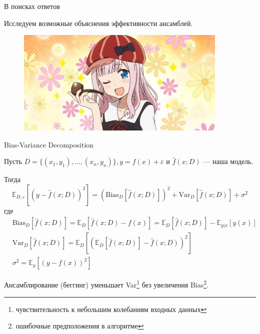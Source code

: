 \documentclass[9pt]{beamer}
\begin{document}
\begin{frame}{В поисках ответов}
    \begin{block}{}
        Исследуем возможные объяснения эффективности ансамблей.
    \end{block}

    \begin{figure}
        \centering
        \includegraphics[width=0.9\textwidth]{images/image4.png}
    \end{figure}
\end{frame}

\begin{frame}{Bias-Variance Decomposition}
    \begin{block}{Пусть}
        $D = \{ (x_1, y_1), \ldots, (x_n, y_n) \}, y = f(x) + \varepsilon$ и $\hat{f}(x; D)$ --- наша модель.
    \end{block}

    \begin{block}{Тогда}
        \begin{equation*}
            \mathbb{E}_{D, \varepsilon} \left[ (y - \hat{f}(x; D))^2 \right] = \left( \text{Bias}_D \left[ \hat{f}(x; D) \right] \right)^2 + \text{Var}_D \left[ \hat{f}(x; D) \right] + \sigma^2
        \end{equation*}
        где
        \begin{align*}
            &\text{Bias}_D \left[ \hat{f}(x; D) \right] = \mathbb{E}_D \left[ \hat{f}(x; D) - f(x) \right] = \mathbb{E}_D \left[ \hat{f}(x; D) \right] - \mathbb{E}_{y | x} \left[ y(x) \right] \\
            &\text{Var}_D \left[ \hat{f}(x; D) \right] = \mathbb{E}_D \left[ \left( \mathbb{E}_D \left[ \hat{f}(x; D) \right] - \hat{f}(x; D) \right)^2 \right] \\
            &\sigma^2 = \mathbb{E}_y \left[ (y - f(x))^2 \right]
        \end{align*}
    \end{block}

    \begin{block}{}
        Ансамблирование (беггинг) уменьшает Var\footnote{чувствительность к небольшим колебаниям входных данных} без увеличения Bias\footnote{ошибочные предположения в алгоритме}.
    \end{block}
\end{frame}
\end{document}
